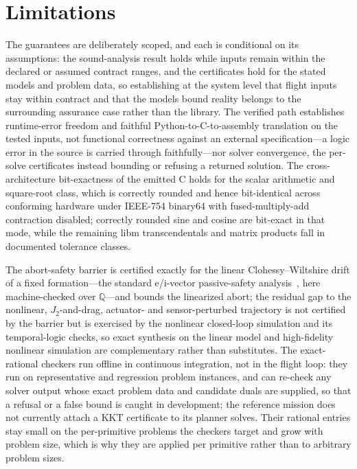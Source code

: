 \documentclass[11pt]{article}
\newcommand{\Q}{\mathbb{Q}}
\begin{document}
\section{Limitations}

The guarantees are deliberately scoped, and each is conditional on its
assumptions: the sound-analysis result holds while inputs remain within the
declared or assumed contract ranges, and the certificates hold for the stated
models and problem data, so establishing at the system level that flight inputs
stay within contract and that the models bound reality belongs to the surrounding
assurance case rather than the library. The verified path establishes
runtime-error freedom and faithful Python-to-C-to-assembly translation on the
tested inputs, not functional correctness against an external specification---a
logic error in the source is carried through faithfully---nor solver convergence,
the per-solve certificates instead bounding or refusing a returned solution. The
cross-architecture bit-exactness of the emitted C holds for the scalar arithmetic
and square-root class, which is correctly rounded and hence bit-identical across
conforming hardware under IEEE-754 binary64 with fused-multiply-add contraction
disabled; correctly rounded sine and cosine are bit-exact in that mode, while the
remaining libm transcendentals and matrix products fall in documented tolerance
classes.

The abort-safety barrier is certified exactly for the linear Clohessy--Wiltshire
drift of a fixed formation---the standard e/i-vector passive-safety analysis~\cite{damico2006eivector}, here
machine-checked over $\Q$---and bounds the linearized abort; the residual gap to
the nonlinear, $J_2$-and-drag, actuator- and sensor-perturbed trajectory is not
certified by the barrier but is exercised by the nonlinear closed-loop simulation
and its temporal-logic checks, so exact synthesis on the linear model and
high-fidelity nonlinear simulation are complementary rather than substitutes. The
exact-rational checkers run offline in continuous integration, not in the flight
loop: they run on representative and regression problem instances, and can re-check
any solver output whose exact problem data and candidate duals are supplied, so
that a refusal or a false bound is caught in development; the reference mission does
not currently attach a KKT certificate to its planner solves. Their rational
entries stay small on the per-primitive problems the checkers target and grow with
problem size, which is why they are applied per primitive rather than to arbitrary
problem sizes.
\end{document}
